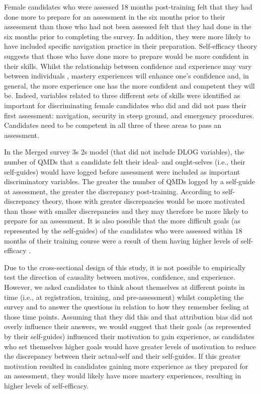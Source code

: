 \documentclass[
  12pt,
  a4paper,
]{book}
\begin{document}
Female candidates who were assessed 18 months post-training felt that they had done more to prepare for an assessment in the six months prior to their assessment than those who had not been assessed felt that they had done in the six months prior to completing the survey. In addition, they were more likely to have included specific navigation practice in their preparation. Self-efficacy theory suggests that those who have done more to prepare would be more confident in their skills. Whilst the relationship between confidence and experience may vary between individuals \citep{Weinberg2014}, mastery experiences will enhance one's confidence \citep{Bandura1977} and, in general, the more experience one has the more confident and competent they will be. Indeed, variables related to three different sets of skills were identified as important for discriminating female candidates who did and did not pass their first assessment: navigation, security in steep ground, and emergency procedures. Candidates need to be competent in all three of these areas to pass an assessment.

In the Merged survey 3s 2s model (that did not include DLOG variables), the number of QMDs that a candidate felt their ideal- and ought-selves (i.e., their self-guides) would have logged before assessment were included as important discriminatory variables. The greater the number of QMDs logged by a self-guide at assessment, the greater the discrepancy post-training. According to self-discrepancy theory, those with greater discrepancies would be more motivated than those with smaller discrepancies \citep{Higgins1987} and they may therefore be more likely to prepare for an assessment. It is also possible that the more difficult goals (as represented by the self-guides) of the candidates who were assessed within 18 months of their training course were a result of them having higher levels of self-efficacy \citep[cf.~][]{Bandura1986}.

Due to the cross-sectional design of this study, it is not possible to empirically test the direction of causality between motives, confidence, and experience. However, we asked candidates to think about themselves at different points in time (i.e., at registration, training, and pre-assessment) whilst completing the survey and to answer the questions in relation to how they remember feeling at those time points. Assuming that they did this and that attribution bias did not overly influence their answers, we would suggest that their goals (as represented by their self-guides) influenced their motivation to gain experience, as candidates who set themselves higher goals would have greater levels of motivation to reduce the discrepancy between their actual-self and their self-guides. If this greater motivation resulted in candidates gaining more experience as they prepared for an assessment, they would likely have more mastery experiences, resulting in higher levels of self-efficacy.
\end{document}
